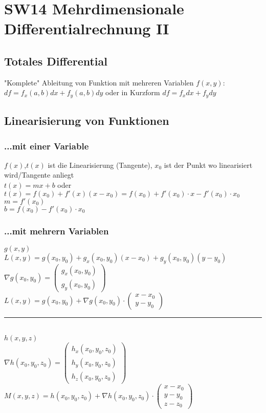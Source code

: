 \documentclass[../main.tex]{subfiles}
\begin{document}
\chapter{SW14 Mehrdimensionale Differentialrechnung II}
\section{Totales Differential}
"Komplete" Ableitung von Funktion mit mehreren Variablen $f(x,y)$: \\ [7pt]
$df=f_x(a,b)dx+f_y(a,b)dy$ oder in Kurzform $df=f_xdx+f_ydy$

\section{Linearisierung von Funktionen}
\subsection{...mit einer Variable}
$f(x)$,$t(x)$ ist die Linearisierung (Tangente), $x_0$ 
ist der Punkt wo linearisiert wird/Tangente anliegt \\ [7pt]
$t(x)=mx + b$ oder $t(x)=f(x_0) + f'(x)(x-x_0) = f(x_0)+f'(x_0)\cdot x-f'(x_0)\cdot x_0$ \\
$m=f'(x_0)$ \\
$b=f(x_0)-f'(x_0)\cdot x_0$

\subsection{...mit mehrern Variablen}
$g(x,y)$ \\ [7pt]
$L(x,y)=g(x_0,y_0)+g_x(x_0,y_0)(x-x_0)+g_y(x_0,y_0)(y-y_0)$ \\ [7pt]
$\nabla g(x_0,y_0)=\begin{pmatrix}g_x(x_0,y_0)\\g_y(x_0,y_0)\end{pmatrix}$ \\ [7pt]
$L(x,y)=g(x_0,y_0) + \nabla g(x_0,y_0) \cdot \begin{pmatrix}x-x_0\\y-y_0\end{pmatrix}$ \\ [14pt]
\noindent\rule{8cm}{0.4pt} \\
$h(x,y,z)$ \\ [7pt]
$\nabla h(x_0,y_0,z_0) = \begin{pmatrix}h_x(x_0,y_0,z_0)\\h_y(x_0,y_0,z_0)\\h_z(x_0,y_0,z_0)\end{pmatrix}$ \\ [7pt]
$M(x,y,z) = h(x_0,y_0,z_0)+ \nabla h(x_0,y_0,z_0) \cdot \begin{pmatrix}x-x_0\\y-y_0\\z-z_0\end{pmatrix}$
\end{document}
